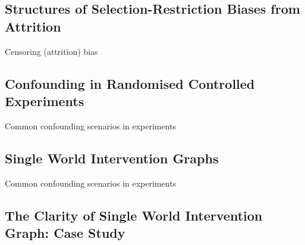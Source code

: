 \documentclass[
  single column]{article}
\begin{document}
\newpage{}

\subsection{Structures of Selection-Restriction Biases from
Attrition}\label{structures-of-selection-restriction-biases-from-attrition}

\begin{table}

\caption{\label{tbl-censoring-bias}Censoring (attrition) bias}

\centering{

\terminologycensoring

}

\end{table}%

\newpage{}

\subsection{Confounding in Randomised Controlled
Experiments}\label{section-confounding-experiments}

\begin{table}

\caption{\label{tbl-experiments}Common confounding scenarios in
experiments}

\centering{

\terminologyelconfoundersexperiments

}

\end{table}%

\newpage{}

\subsection{Single World Intervention
Graphs}\label{single-world-intervention-graphs}

\begin{table}

\caption{\label{tbl-experiments}Common confounding scenarios in
experiments}

\centering{

\swigtable

}

\end{table}%

\newpage{}

\subsection{The Clarity of Single World Intervention Graph: Case
Study}\label{the-clarity-of-single-world-intervention-graph-case-study}
\end{document}
